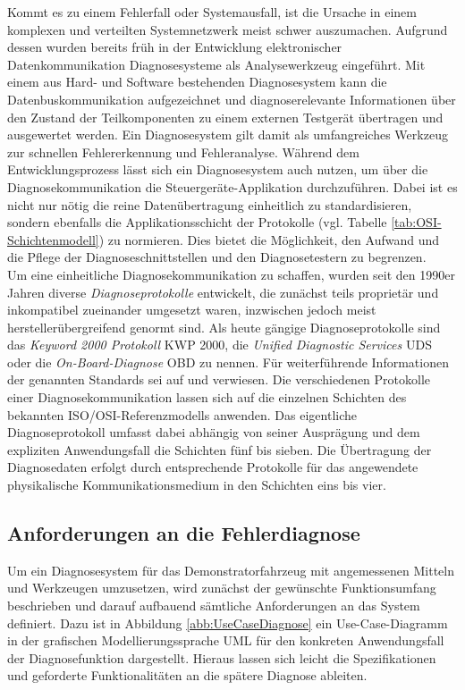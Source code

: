 Kommt es zu einem Fehlerfall oder Systemausfall, ist die Ursache in einem komplexen und verteilten Systemnetzwerk meist schwer auszumachen. Aufgrund dessen wurden bereits früh in der Entwicklung elektronischer Datenkommunikation Diagnosesysteme als Analysewerkzeug eingeführt. Mit einem aus Hard- und Software bestehenden Diagnosesystem kann die Datenbuskommunikation aufgezeichnet und diagnoserelevante Informationen über den Zustand der Teilkomponenten zu einem externen Testgerät übertragen und ausgewertet werden. Ein Diagnosesystem gilt damit als umfangreiches Werkzeug zur schnellen Fehlererkennung und Fehleranalyse. Während dem Entwicklungsprozess lässt sich ein Diagnosesystem auch nutzen, um über die Diagnosekommunikation die Steuergeräte-Applikation durchzuführen. Dabei ist es nicht nur nötig die reine Datenübertragung einheitlich zu standardisieren, sondern ebenfalls die Applikationsschicht der Protokolle (vgl. Tabelle \ref{tab:OSI-Schichtenmodell}) zu normieren. Dies bietet die Möglichkeit, den Aufwand und die Pflege der Diagnoseschnittstellen und den Diagnosetestern zu begrenzen. \\
Um eine einheitliche Diagnosekommunikation zu schaffen, wurden seit den 1990er Jahren diverse \emph{Diagnoseprotokolle} entwickelt, die zunächst teils proprietär und inkompatibel zueinander umgesetzt waren, inzwischen jedoch meist herstellerübergreifend genormt sind. Als heute gängige Diagnoseprotokolle sind das \emph{Keyword 2000 Protokoll} \acs{KWP} 2000, die \emph{Unified Diagnostic Services} \acs{UDS} oder die \emph{On-Board-Diagnose} \acs{OBD} zu nennen. Für weiterführende Informationen der genannten Standards sei auf \cite{Zimmermann.2014} und \cite{Schaffer.2012} verwiesen. Die verschiedenen Protokolle einer Diagnosekommunikation lassen sich auf die einzelnen Schichten des bekannten ISO/OSI-Referenzmodells anwenden. Das eigentliche Diagnoseprotokoll umfasst dabei abhängig von seiner Ausprägung und dem expliziten Anwendungsfall die Schichten fünf bis sieben. Die Übertragung der Diagnosedaten erfolgt durch entsprechende Protokolle für das angewendete physikalische Kommunikationsmedium in den Schichten eins bis vier. 


\subsection{Anforderungen an die Fehlerdiagnose}
\label{subsec:AnforderungenDiagnose}

Um ein Diagnosesystem für das Demonstratorfahrzeug mit angemessenen Mitteln und Werkzeugen umzusetzen, wird zunächst der gewünschte Funktionsumfang beschrieben und darauf aufbauend sämtliche Anforderungen an das System definiert.
Dazu ist in Abbildung \ref{abb:UseCaseDiagnose} ein Use-Case-Diagramm in der grafischen Modellierungssprache \acs{UML} für den konkreten Anwendungsfall der Diagnosefunktion dargestellt. Hieraus lassen sich leicht die Spezifikationen und geforderte Funktionalitäten an die spätere Diagnose ableiten.

